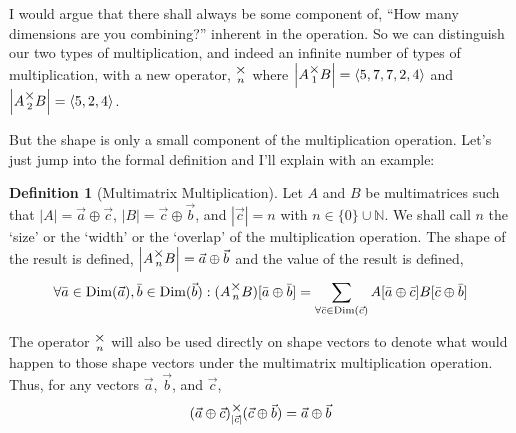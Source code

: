 \documentclass[12pt]{book}
\theoremstyle{plain}
\theoremstyle{definition}
\newtheorem{definition}{Definition}[chapter]
\theoremstyle{ppart}
\theoremstyle{case}
\theoremstyle{solution}
\DeclareMathOperator{\Dim}{Dim}
\newcommand{\mmult}[1]{\text{\raisebox{1ex}{$\underset{#1}{\times}$}}}
\newcommand{\shape}[1]{\left|#1\right|}
\begin{document}
I would argue that there shall always be some component of, 
``How many dimensions are you combining?'' inherent
in the operation. So we can distinguish our two types of multiplication, and indeed
an infinite number of types of multiplication, with a new operator, $\mmult{n}$ where
$\shape{A \mmult{1} B} = \left<5, 7, 7, 2, 4\right>$ and 
$\shape{A \mmult{2} B} = \left<5, 2, 4\right>$.

But the shape is only a small component of the multiplication  operation. Let's
just jump into the formal definition and I'll explain with an example:

\begin{definition}[Multimatrix Multiplication]
\label{mm_mult}
Let $A$ and $B$ be multimatrices such that $\shape{A} = \vec{a} \oplus \vec{c}$,
$\shape{B} = \vec{c} \oplus \vec{b}$, and $\shape{\vec{c}} = n$ with
$n \in \{0\} \cup \mathbb{N}$. We shall call $n$ the `size' or the `width'
or the `overlap' of the multiplication operation.
The shape of the result is defined, $\shape{A \mmult{n} B} = \vec{a} \oplus \vec{b}$
and the value of the result is defined,
\[
\forall \bar{a} \in \Dim(\vec{a}), \bar{b} \in \Dim(\vec{b}):
(A \mmult{n}  B)[\bar{a} \oplus \bar{b}] =
\sum_{\forall \bar{c} \in \Dim(\vec{c})}
  A[\bar{a} \oplus \bar{c}] B[\bar{c} \oplus \bar{b}]
\]

The operator $\mmult{n}$ will also be used directly on shape vectors to denote
what would happen to those shape vectors under the multimatrix multiplication operation.
Thus, for any vectors $\vec{a}$, $\vec{b}$, and $\vec{c}$,
\[ (\vec{a} \oplus \vec{c}) \mmult{\shape{\vec{c}}} (\vec{c} \oplus \vec{b}) = \vec{a} \oplus \vec{b} \]
\end{definition}
\end{document}
